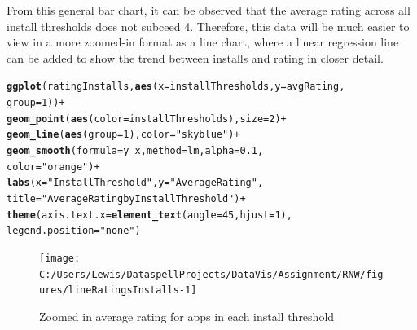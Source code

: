 \documentclass[12pt]{report}\usepackage[]{graphicx}\usepackage[]{xcolor}
\makeatletter
\newcommand{\hlnum}[1]{\textcolor[rgb]{0.686,0.059,0.569}{#1}}%
\newcommand{\hlstr}[1]{\textcolor[rgb]{0.192,0.494,0.8}{#1}}%
\newcommand{\hlopt}[1]{\textcolor[rgb]{0,0,0}{#1}}%
\newcommand{\hlstd}[1]{\textcolor[rgb]{0.345,0.345,0.345}{#1}}%
\newcommand{\hlkwc}[1]{\textcolor[rgb]{0.333,0.667,0.333}{#1}}%
\newcommand{\hlkwd}[1]{\textcolor[rgb]{0.737,0.353,0.396}{\textbf{#1}}}%
\newenvironment{kframe}{%
 \def\at@end@of@kframe{}%
 \ifinner\ifhmode%
  \def\at@end@of@kframe{\end{minipage}}%
  \begin{minipage}{\columnwidth}%
 \fi\fi%
 \def\FrameCommand##1{\hskip\@totalleftmargin \hskip-\fboxsep
 \colorbox{shadecolor}{##1}\hskip-\fboxsep
     \hskip-\linewidth \hskip-\@totalleftmargin \hskip\columnwidth}%
 \MakeFramed {\advance\hsize-\width
   \@totalleftmargin\z@ \linewidth\hsize
   \@setminipage}}%
 {\par\unskip\endMakeFramed%
 \at@end@of@kframe}
\newenvironment{knitrout}{}{} %
\makeatother
\begin{document}
From this general bar chart, it can be observed that the average rating across all install thresholds
does not subceed 4. Therefore, this data will be much easier to view in a more zoomed-in format as a line chart,
where a linear regression line can be added to show the trend between installs and rating in closer detail.

\begin{knitrout}
\color{fgcolor}\begin{kframe}
\begin{alltt}
\hlkwd{ggplot}\hlstd{(ratingInstalls,} \hlkwd{aes}\hlstd{(}\hlkwc{x} \hlstd{= installThresholds,} \hlkwc{y} \hlstd{= avgRating,}
                           \hlkwc{group} \hlstd{=} \hlnum{1}\hlstd{))} \hlopt{+}
    \hlkwd{geom_point}\hlstd{(}\hlkwd{aes}\hlstd{(}\hlkwc{color} \hlstd{= installThresholds),} \hlkwc{size} \hlstd{=} \hlnum{2}\hlstd{)} \hlopt{+}
    \hlkwd{geom_line}\hlstd{(}\hlkwd{aes}\hlstd{(}\hlkwc{group} \hlstd{=} \hlnum{1}\hlstd{),} \hlkwc{color} \hlstd{=} \hlstr{"skyblue"}\hlstd{)} \hlopt{+}
    \hlkwd{geom_smooth}\hlstd{(}\hlkwc{formula} \hlstd{= y} \hlopt{~} \hlstd{x,} \hlkwc{method} \hlstd{= lm,} \hlkwc{alpha} \hlstd{=} \hlnum{0.1}\hlstd{,}
                \hlkwc{color} \hlstd{=} \hlstr{"orange"}\hlstd{)} \hlopt{+}
    \hlkwd{labs}\hlstd{(}\hlkwc{x} \hlstd{=} \hlstr{"Install Threshold"}\hlstd{,} \hlkwc{y} \hlstd{=} \hlstr{"Average Rating"}\hlstd{,}
         \hlkwc{title} \hlstd{=} \hlstr{"Average Rating by Install Threshold"}\hlstd{)} \hlopt{+}
    \hlkwd{theme}\hlstd{(}\hlkwc{axis.text.x} \hlstd{=} \hlkwd{element_text}\hlstd{(}\hlkwc{angle} \hlstd{=} \hlnum{45}\hlstd{,} \hlkwc{hjust} \hlstd{=} \hlnum{1}\hlstd{),}
          \hlkwc{legend.position} \hlstd{=} \hlstr{"none"}\hlstd{)}
\end{alltt}
\end{kframe}\begin{figure}[H]

{\centering \texttt{[image: C:/Users/Lewis/DataspellProjects/DataVis/Assignment/RNW/figures/lineRatingsInstalls-1]} 

}

\caption[Zoomed in average rating for apps in each install threshold]{Zoomed in average rating for apps in each install threshold}\label{fig:lineRatingsInstalls}
\end{figure}

\end{knitrout}
\end{document}
